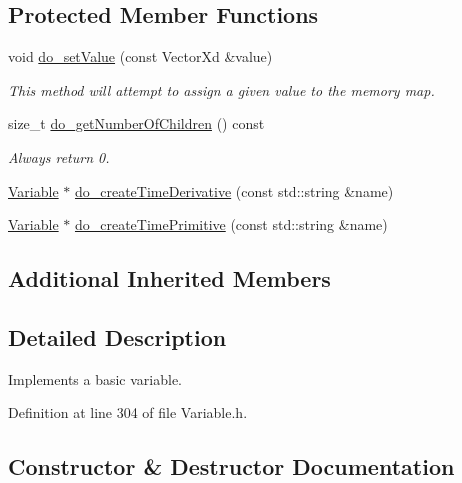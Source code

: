 \subsection*{Protected Member Functions}
\begin{DoxyCompactItemize}
\item 
void \hyperlink{classocra_1_1BaseVariable_a4f53b244e0efba4ca19f558113d29a9c}{do\+\_\+set\+Value} (const Vector\+Xd \&value)
\begin{DoxyCompactList}\small\item\em This method will attempt to assign a given value to the memory map. \end{DoxyCompactList}\item 
size\+\_\+t \hyperlink{classocra_1_1BaseVariable_abf5dc1c3eaa689663cc09e06b8f5b3a1}{do\+\_\+get\+Number\+Of\+Children} () const
\begin{DoxyCompactList}\small\item\em Always return 0. \end{DoxyCompactList}\end{DoxyCompactItemize}
{\bf }\par
\begin{DoxyCompactItemize}
\item 
\hyperlink{classocra_1_1Variable}{Variable} $\ast$ \hyperlink{classocra_1_1BaseVariable_a064b6501c110661e9fa12a0250d4de6b}{do\+\_\+create\+Time\+Derivative} (const std\+::string \&name)
\item 
\hyperlink{classocra_1_1Variable}{Variable} $\ast$ \hyperlink{classocra_1_1BaseVariable_ab010bd127ba34ff57168bf69182a78d5}{do\+\_\+create\+Time\+Primitive} (const std\+::string \&name)
\end{DoxyCompactItemize}

\subsection*{Additional Inherited Members}


\subsection{Detailed Description}
Implements a basic variable. 

Definition at line 304 of file Variable.\+h.



\subsection{Constructor \& Destructor Documentation}
\hypertarget{classocra_1_1BaseVariable_ae86fd20357d1b333c73d22b7a9a010f6}{}\label{classocra_1_1BaseVariable_ae86fd20357d1b333c73d22b7a9a010f6} 
